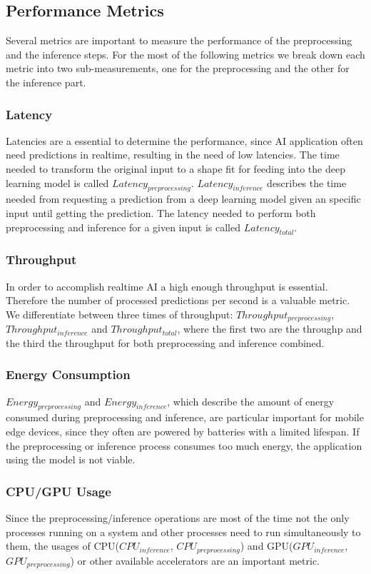 \subsection{Performance Metrics}
Several metrics are important to measure the performance of the preprocessing and the inference steps. For the most of the following metrics we break down each metric into two sub-measurements, one for the preprocessing  and the other for the inference part.

\subsubsection{Latency}
Latencies are a essential to determine the performance, since AI application often need predictions in realtime, resulting in the need of low latencies.
The time needed to transform the original input to a shape fit for feeding into the deep learning model is called $Latency_{preprocessing}$.
$Latency_{inference}$ describes the time needed from requesting a prediction from a deep learning model given an specific input until getting the prediction.
The latency needed to perform both preprocessing and inference for a given input is called $Latency_{total}$.
\subsubsection{Throughput}
In order to accomplish realtime AI a high enough throughput is essential. Therefore the number of processed predictions per second is a valuable metric. We differentiate between three times of throughput: $Throughput_{preprocessing}$, $Throughput_{inference}$ and $Throughput_{total}$, where the first two are the throughp and the third the throughput for both preprocessing and inference combined.



\subsubsection{Energy Consumption}
$Energy_{preprocessing}$ and $Energy_{inference}$, which describe the amount of energy consumed during preprocessing and inference, are particular important for mobile edge devices, since they often are powered by batteries with a limited lifespan. If the preprocessing or inference process consumes too much energy, the application using the model is not viable.


\subsubsection{CPU/GPU Usage}
Since the preprocessing/inference operations are most of the time not the only processes running on a system and other processes need to run simultaneously to them, the usages of CPU($CPU_{inference}$, $CPU_{preprocessing}$) and GPU($GPU_{inference}$, $GPU_{preprocessing}$) or other available accelerators are an important metric.


